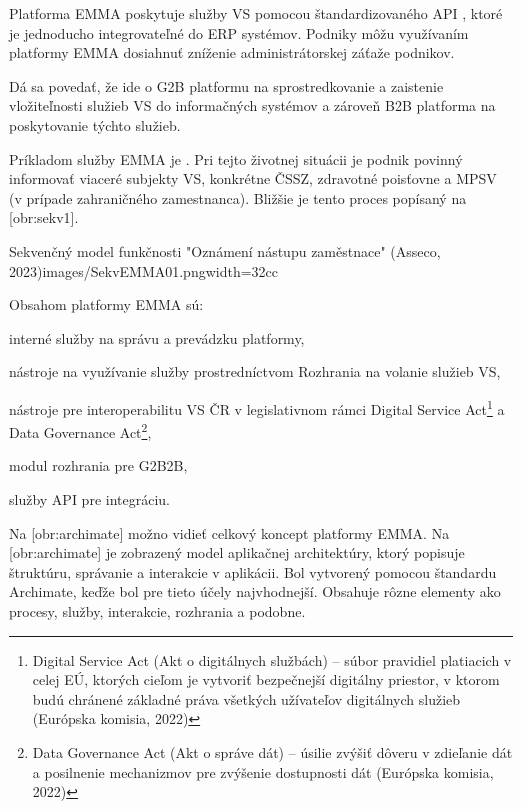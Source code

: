 Platforma EMMA poskytuje služby VS pomocou štandardizovaného API
, ktoré je jednoducho integrovateľné do ERP systémov. Podniky môžu využívaním platformy EMMA dosiahnuť zníženie administrátorskej záťaže podnikov. 

Dá sa povedať, že ide o G2B platformu na sprostredkovanie a zaistenie vložiteľnosti služieb VS do informačných systémov a zároveň B2B platforma na poskytovanie týchto služieb.

Príkladom služby EMMA je . Pri tejto životnej situácii je podnik povinný informovať viaceré subjekty VS, konkrétne ČSSZ, zdravotné poisťovne a MPSV (v prípade zahraničného zamestnanca). Bližšie je tento proces popísaný na [obr:sekv1].

{Sekvenčný model funkčnosti "Oznámení nástupu zaměstnace" (Asseco, 2023)}{images/SekvEMMA01.png}{width=32cc}

Obsahom platformy EMMA sú:

\startitemize
\item{interné služby na správu a prevádzku platformy,}
\item{nástroje na využívanie služby prostredníctvom Rozhrania na volanie služieb VS,}
\item{nástroje pre interoperabilitu VS ČR v legislativnom rámci Digital Service Act\footnote{Digital Service Act (Akt o digitálnych službách) -- súbor pravidiel platiacich v celej EÚ, ktorých cieľom je vytvoriť bezpečnejší digitálny priestor, v ktorom budú chránené základné práva všetkých užívateľov digitálnych služieb \scr(Európska komisia, 2022)} a Data Governance Act\footnote{Data Governance Act (Akt o správe dát) -- úsilie zvýšiť dôveru v zdieľanie dát a posilnenie mechanizmov pre zvýšenie dostupnosti dát \scr(Európska komisia, 2022)},}
\item{modul rozhrania pre G2B2B,}
\item{služby API pre integráciu.}
\stopitemize 

Na [obr:archimate] možno vidieť celkový koncept platformy EMMA. Na [obr:archimate] je zobrazený model aplikačnej architektúry, ktorý popisuje štruktúru, správanie a interakcie v aplikácii. Bol vytvorený pomocou štandardu Archimate, keďže bol pre tieto účely najvhodnejší. Obsahuje rôzne elementy ako procesy, služby, interakcie, rozhrania a podobne.

